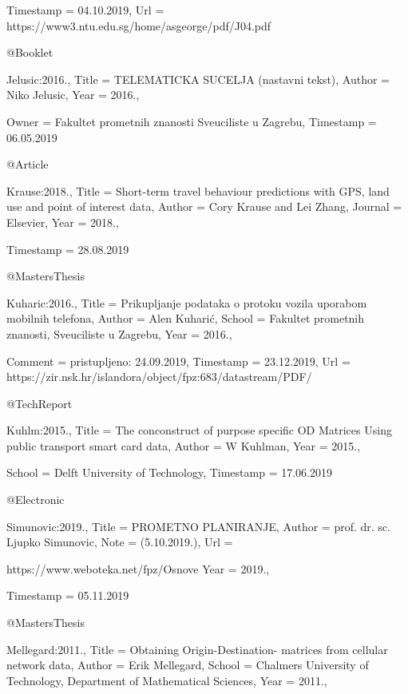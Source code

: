 {{  Timestamp                = {04.10.2019},
  Url                      = {https://www3.ntu.edu.sg/home/asgeorge/pdf/J04.pdf}
}

@Booklet{Jelusic:2016.,
  Title                    = {TELEMATICKA SUCELJA (nastavni tekst)},
  Author                   = {Niko Jelusic},
  Year                     = {2016.},

  Owner                    = {Fakultet prometnih znanosti Sveuciliste u Zagrebu},
  Timestamp                = {06.05.2019}
}

@Article{Krause:2018.,
  Title                    = {Short-term travel behaviour predictions with GPS, land use and point of interest data},
  Author                   = {Cory Krause and Lei Zhang},
  Journal                  = {Elsevier},
  Year                     = {2018.},

  Timestamp                = {28.08.2019}
}

@MastersThesis{Kuharic:2016.,
  Title                    = {Prikupljanje podataka o protoku vozila uporabom
mobilnih telefona},
  Author                   = {Alen Kuhari\'c},
  School                   = {Fakultet prometnih znanosti, Sveuciliste u Zagrebu},
  Year                     = {2016.},

  Comment                  = {pristupljeno: 24.09.2019},
  Timestamp                = {23.12.2019},
  Url                      = {https://zir.nsk.hr/islandora/object/fpz:683/datastream/PDF/}
}

@TechReport{Kuhlm:2015.,
  Title                    = {The conconstruct of purpose specific OD Matrices Using public transport smart card data},
  Author                   = {W Kuhlman},
  Year                     = {2015.},

  School                   = {Delft University of Technology},
  Timestamp                = {17.06.2019}
}

@Electronic{Simunovic:2019.,
  Title                    = {PROMETNO PLANIRANJE},
  Author                   = {prof. dr. sc. Ljupko Simunovic},
  Note                     = {(5.10.2019.)},
  Url                      = {https://www.weboteka.net/fpz/Osnove%
  Year                     = {2019.},

  Timestamp                = {05.11.2019}
}

@MastersThesis{Mellegard:2011.,
  Title                    = {Obtaining Origin-Destination- matrices from cellular network data},
  Author                   = {Erik Mellegard},
  School                   = {Chalmers University of Technology, Department of Mathematical Sciences},
  Year                     = {2011.},

}}}
